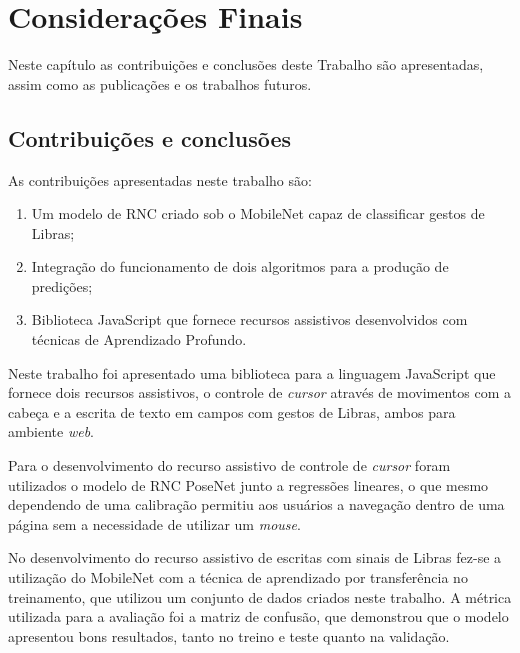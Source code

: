 \newpage
\chapter{Considerações Finais}

\par Neste capítulo as contribuições e conclusões deste Trabalho são apresentadas, assim como as publicações e os trabalhos futuros.

\section{Contribuições e conclusões}

\par As contribuições apresentadas neste trabalho são:

\begin{enumerate}
    \item Um modelo de RNC criado sob o MobileNet capaz de classificar gestos de Libras;
    \item Integração do funcionamento de dois algoritmos para a produção de predições; 
    \item Biblioteca JavaScript que fornece recursos assistivos desenvolvidos com técnicas de Aprendizado Profundo.
\end{enumerate}

\par Neste trabalho foi apresentado uma biblioteca para a linguagem JavaScript que fornece dois recursos assistivos, o controle de \textit{cursor} através de movimentos com a cabeça e a escrita de texto em campos com gestos de Libras, ambos para ambiente \textit{web}.

\par Para o desenvolvimento do recurso assistivo de controle de \textit{cursor} foram utilizados o modelo de RNC PoseNet junto a regressões lineares, o que mesmo dependendo de uma calibração permitiu aos usuários a navegação dentro de uma página sem a necessidade de utilizar um \textit{mouse}.

\par No desenvolvimento do recurso assistivo de escritas com sinais de Libras fez-se a utilização do MobileNet com a técnica de aprendizado por transferência no treinamento, que utilizou um conjunto de dados criados neste trabalho. A métrica utilizada para a avaliação foi a matriz de confusão, que demonstrou que o modelo apresentou bons resultados, tanto no treino e teste quanto na validação.

